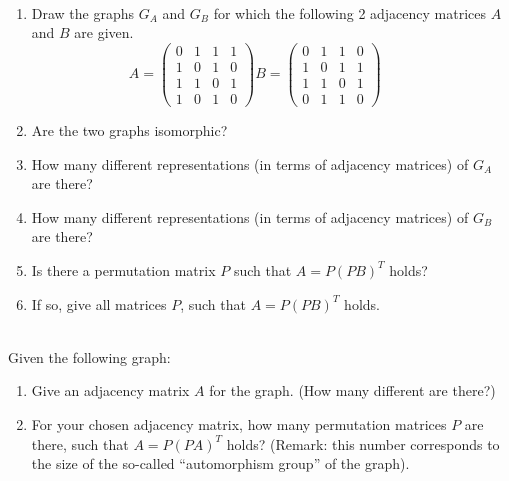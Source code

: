 \documentclass[10pt]{article}
\begin{document}
\\
\begin{enumerate}
\item Draw the graphs $G_A$ and $G_B$ for which the following 2 adjacency matrices $A$ and $B$ are given.
\begin{equation*}
A= \left(\begin{array}{ccccc}
           0 & 1 & 1 & 1  \\
           1 & 0 & 1 & 0  \\
           1 & 1 & 0 & 1  \\
           1 & 0 & 1 & 0  
\end{array}\right)
B= \left(\begin{array}{ccccc}
           0 & 1 & 1 & 0  \\
           1 & 0 & 1 & 1  \\
           1 & 1 & 0 & 1  \\
           0 & 1 & 1 & 0  
\end{array}\right)\hspace{1cm}
\end{equation*}
\item Are the two graphs isomorphic?
\item How many different representations (in terms of adjacency matrices) of $G_A$ are there?
\item How many different representations (in terms of adjacency matrices) of $G_B$ are there?
\item Is there a permutation matrix $P$ such that $A=P\left(PB\right)^T$ holds? 
\item If so, give all matrices $P$, such that  $A=P\left(PB\right)^T$ holds.
\end{enumerate}

\\[1cm]
Given the following graph:\\

\begin{enumerate}
\item Give an adjacency matrix $A$ for the graph. (How many different are there?)
\item For your chosen adjacency matrix, how many permutation matrices $P$ are there, such that
  $A=P\left(PA\right)^T$ holds? (Remark: this number corresponds to the size of the so-called ``automorphism group'' of the graph). 
\end{enumerate}
\newpage
\end{document}
